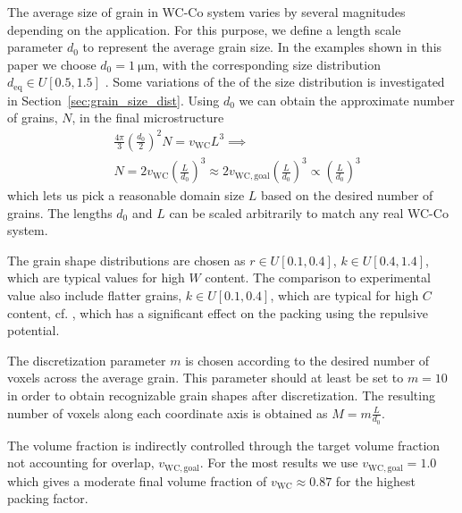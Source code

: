 \documentclass[3p,12pt]{elsarticle}
\newcommand{\WC}{\mathrm{WC}}
\begin{document}
The average size of grain in WC-Co system varies by several magnitudes depending on the application.
For this purpose, we define a length scale parameter $d_0$ to represent the average grain size.
In the examples shown in this paper we choose $d_0 = \SI{1}{\micro\meter}$, with the corresponding size distribution $d_\text{eq} \in U[0.5, 1.5]$ \cite{lay_morphology_2008}.
Some variations of the of the size distribution is investigated in Section~\ref{sec:grain_size_dist}.
Using $d_0$ we can obtain the approximate number of grains, $N$, in the final microstructure 
\begin{align}
 &\nonumber \frac{4\pi}{3} \left(\frac{d_0}{2}\right)^2 N = v_\WC L^3 \implies 
 \\
 &N = 2 v_\WC \left(\frac{L}{d_0}\right)^3 \approx 2 v_{\WC,\text{goal}} \left(\frac{L}{d_0}\right)^3 \propto \left(\frac{L}{d_0}\right)^3
\end{align}
which lets us pick a reasonable domain size $L$ based on the desired number of grains.
The lengths $d_0$ and $L$ can be scaled arbitrarily to match any real WC-Co system.

The grain shape distributions are chosen as $r \in U[0.1, 0.4]$, $k \in U[0.4, 1.4]$, which are typical values for high $W$ content.
The comparison to experimental value also include flatter grains, $k \in U[0.1, 0.4]$, which are typical for high $C$ content, cf. \cite{lay_morphology_2008}, which has a significant effect on the packing using the repulsive potential.


The discretization parameter $m$ is chosen according to the desired number of voxels across the average grain.
This parameter should at least be set to $m = 10$ in order to obtain recognizable grain shapes after discretization.
The resulting number of voxels along each coordinate axis is obtained as $M = m \frac{L}{d_0}$.

The volume fraction is indirectly controlled through the target volume fraction not accounting for overlap, $v_{\WC,\text{goal}}$.
For the most results we use $v_{\WC,\text{goal}} = 1.0$ which gives a moderate final volume fraction of $v_\WC \approx 0.87$ for the highest packing factor.
\end{document}
